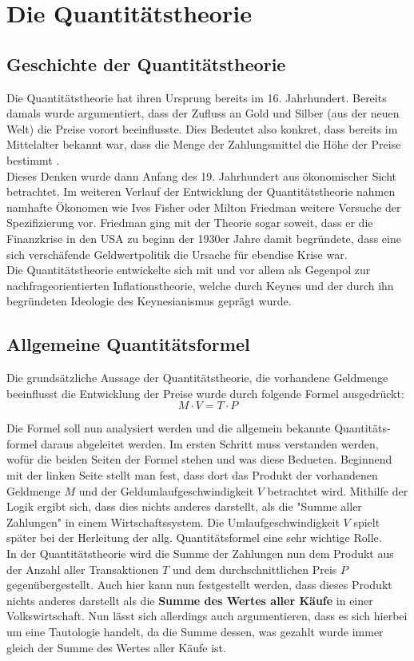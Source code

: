 \chapter{Die Quantitätstheorie}

\section{Geschichte der Quantitätstheorie}
Die Quantitätstheorie hat ihren Ursprung bereits im 16. Jahrhundert. Bereits damals wurde argumentiert, dass der Zufluss an Gold und Silber (aus der neuen Welt) die Preise vorort beeinflusste. Dies Bedeutet also konkret, dass bereits im Mittelalter bekannt war, dass die Menge der Zahlungsmittel die Höhe der Preise bestimmt \autocite{Woll1977}. \\
Dieses Denken wurde dann Anfang des 19. Jahrhundert aus ökonomischer Sicht betrachtet. Im weiteren Verlauf der Entwicklung der Quantitätstheorie nahmen namhafte Ökonomen wie Ives Fisher oder Milton Friedman weitere Versuche der Spezifizierung vor. Friedman ging mit der Theorie sogar soweit, dass er die Finanzkrise in den USA zu beginn der 1930er Jahre damit begründete, dass eine sich verschäfende Geldwertpolitik die Ursache für ebendise Krise war. \\
Die Quantitätstheorie entwickelte sich mit und vor allem als Gegenpol zur nachfrageorientierten Inflationstheorie, welche durch Keynes und der durch ihn begründeten Ideologie des Keynesianismus geprägt wurde.

\section{Allgemeine Quantitätsformel}

Die grundsätzliche Aussage der Quantitätstheorie, die vorhandene Geldmenge beeinflusst die Entwicklung der Preise wurde durch folgende Formel ausgedrückt:
$$ M \cdot V = T \cdot P$$\label{allg. Q-Formel}

Die Formel soll nun analysiert werden und die allgemein bekannte Quantitäts-formel daraus abgeleitet werden. Im ersten Schritt muss verstanden werden, wofür die beiden Seiten der Formel stehen und was diese Bedueten. 
Beginnend mit der linken Seite stellt man fest, dass dort das Produkt der vorhandenen Geldmenge $M$ und der Geldumlaufgeschwindigkeit $V$ betrachtet wird. Mithilfe der Logik ergibt sich, dass dies nichts anderes darstellt, als die "Summe aller Zahlungen" in einem Wirtschaftssystem. Die Umlaufgeschwindigkeit $V$ spielt später bei der Herleitung der allg. Quantitätsformel eine sehr wichtige Rolle. \\
In der Quantitätstheorie wird die Summe der Zahlungen nun dem Produkt aus der Anzahl aller Transaktionen $T$ und dem durchschnittlichen Preis $P$ gegenübergestellt. Auch hier kann nun festgestellt werden, dass dieses Produkt nichts anderes darstellt als die \textbf{Summe des Wertes aller Käufe} in einer Volkswirtschaft. Nun lässt sich allerdings auch argumentieren, dass es sich hierbei um eine Tautologie handelt, da die Summe dessen, was gezahlt wurde immer gleich der Summe des Wertes aller Käufe ist.

